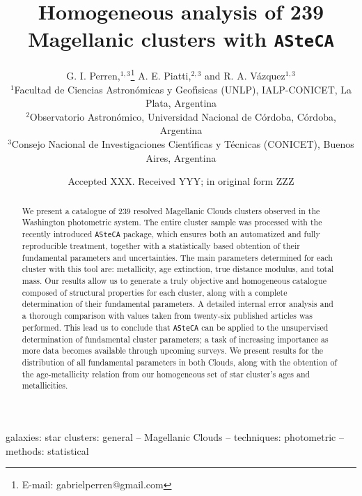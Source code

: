 \documentclass[a4paper,fleqn,usenatbib]{mnras}
\title[Analysis of Magellanic clusters with \texttt{ASteCA}]{Homogeneous
analysis of 239 Magellanic clusters with \texttt{ASteCA}}
\author[Perren et al.]{
G. I. Perren,$^{1,3}$\thanks{E-mail: gabrielperren@gmail.com}
A. E. Piatti,$^{2,3}$
and R. A. V\'azquez$^{1,3}$
\\
$^{1}$Facultad de Ciencias Astron\'omicas y Geof\'{\i}sicas (UNLP),
IALP-CONICET, La Plata, Argentina\\
$^{2}$Observatorio Astron\'omico, Universidad Nacional de C\'ordoba, C\'ordoba,
Argentina\\
$^{3}$Consejo Nacional de Investigaciones Cient\'{\i}ficas y T\'ecnicas
(CONICET), Buenos Aires, Argentina
}
\date{Accepted XXX. Received YYY; in original form ZZZ}
\begin{document}
\label{firstpage}
\pagerange{\pageref{firstpage}--\pageref{lastpage}}
\maketitle

\begin{abstract}
We present a catalogue of 239 resolved Magellanic Clouds clusters observed in
the Washington photometric system.
The entire cluster sample was processed with the recently introduced
\texttt{ASteCA} package, which ensures both an automatized and fully
reproducible treatment, together with a statistically based obtention of their
fundamental parameters and uncertainties.
%
The main parameters determined for each cluster with this tool are: metallicity,
age extinction, true distance modulus, and total mass.
%
%
Our results allow us to generate a truly objective and homogeneous catalogue
composed of structural properties for each cluster, along with a complete
determination of their fundamental parameters.
%
A detailed internal error analysis and a thorough comparison with values taken
from twenty-six published articles was performed. This lead us to conclude that
\texttt{ASteCA} can be applied to the unsupervised determination of fundamental
cluster parameters; a task of increasing importance as more data becomes
available through upcoming surveys.
%
We present results for the distribution of all fundamental parameters in both
Clouds, along with the obtention of the age-metallicity relation from
our homogeneous set of star cluster's ages and metallicities.
\end{abstract}

\begin{keywords}
galaxies: star clusters: general -- Magellanic Clouds --
techniques: photometric -- methods: statistical
\end{keywords}



\end{document}
